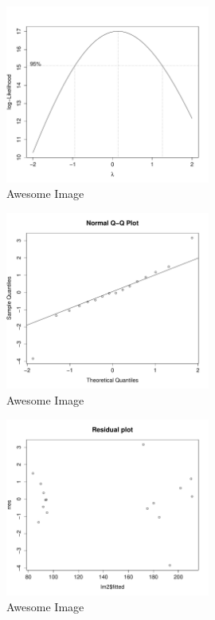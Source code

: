 \begin{figure}[p]
    \centering
    \includegraphics[width=0.6\textwidth]{PDF/boxCox.pdf}
    \caption{Awesome Image}
    \label{fig:awesome_image}
\end{figure}

\begin{figure}[p]
    \centering
    \includegraphics[width=0.6\textwidth]{PDF/qqPlot.pdf}
    \caption{Awesome Image}
    \label{fig:awesome_image}
\end{figure}

\begin{figure}[p]
    \centering
    \includegraphics[width=0.6\textwidth]{PDF/residualPlot.pdf}
    \caption{Awesome Image}
    \label{fig:awesome_image}
\end{figure}

